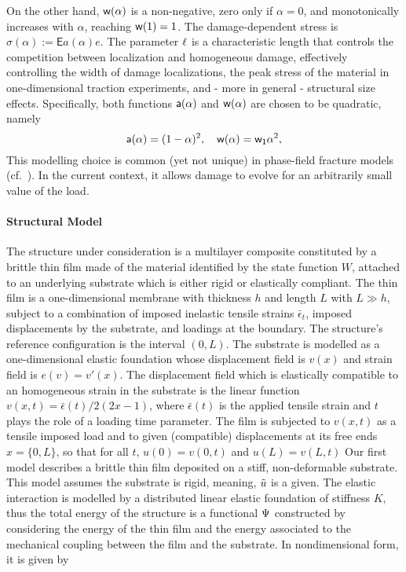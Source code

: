 On the other hand, $\mathsf{w}(\alpha)$ is a non-negative, zero only if $\alpha=0$, and monotonically increases with $\alpha$, reaching $\mathsf{w}(1)=1$. 
The damage-dependent stress is $\sigma(\alpha):=\mathsf{E}a(\alpha) e$. The parameter $\ell$ is a characteristic length that controls the competition between localization and homogeneous damage, effectively controlling the width of damage localizations, the peak stress of the material in one-dimensional traction experiments, and - more in general - structural size effects.
Specifically, both functions $\mathsf{a}(\alpha)$  
 and $\mathsf{w}(\alpha)$ are chosen to be quadratic, namely 
\begin{equation}
    \label{def:constitutive_functions}
    \mathsf{a}(\alpha) = (1-\alpha)^2, \quad \mathsf{w}(\alpha) = \mathsf{w_1}\alpha^2,
\end{equation}
This modelling choice is common (yet not unique) in phase-field fracture models (cf.~\cite{Bourdin2000-pc,Miehe2010-sj,Miehe2010-ja}). In the current context, it allows damage to evolve for an arbitrarily small value of the load. 




\paragraph{Structural Model}
The structure under consideration is a multilayer composite constituted by a brittle thin film  made of the material identified by the state function $W$, attached to an underlying substrate which is either rigid or elastically compliant. The thin film is a one-dimensional membrane with thickness $h$ and length $L$ with $L\gg h$, subject to a combination of imposed inelastic tensile strains $\bar\epsilon_t$, imposed displacements by the substrate, and loadings at the boundary. The structure's reference configuration is the interval $(0, L)$. 
% 
The substrate is modelled as a one-dimensional elastic foundation whose displacement field is $v(x)$ and strain field is $e(v) = v'(x)$. 
% 
The displacement field which is elastically compatible to an homogeneous strain in the substrate is the linear function $v(x, t) = \bar\epsilon(t)/2 (2x-1)$, where $\bar\epsilon(t)$ is the applied tensile strain and $t$ plays the role of a loading time parameter. 
% 
The film is subjected to $v(x, t)$ as a tensile imposed load and to given (compatible) displacements at its free ends $x = \{0, L\}$, so that for all $t$, $u(0)=v(0, t)$ and $u(L)=v(L, t)$
% 
Our first model describes a brittle thin film deposited on a stiff, non-deformable substrate. This model assumes the substrate is rigid, meaning, $\tilde u$ is a given. The elastic interaction is modelled by a distributed linear elastic foundation of stiffness $K$, thus
the total energy of the structure is a functional $\Psi$ constructed by considering the energy of the thin film and the energy associated to the mechanical coupling between the film and the substrate. In nondimensional form, it is given by

